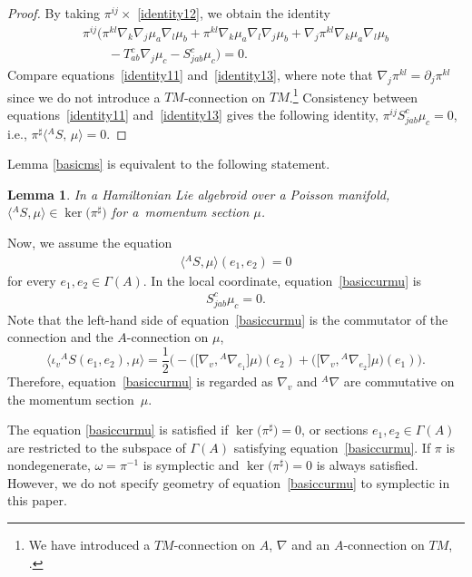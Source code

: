 \documentclass[pdftex]{sigma}
\numberwithin{equation}{section}
\newtheorem{Lemma}[Theorem]{Lemma}
\newcommand{\bracket}[2]{\langle #1,\,#2\rangle}
\newcommand{\nablabas}{{{}^A \nabla}^{\mathrm{bas}}}
\newcommand{\anabla}{{{}^A \nabla}}
\begin{document}
\begin{proof}
By taking $\pi^{ij} \times$ \eqref{identity12},
we obtain the identity
\begin{gather}
 \pi^{ij}\bigl(\pi^{kl} \nabla_k \nabla_j \mu_a \nabla_l \mu_b
+ \pi^{kl} \nabla_k \mu_a \nabla_l \nabla_j \mu_b
+ \nabla_j \pi^{kl} \nabla_k \mu_a \nabla_l \mu_b\nonumber\\
\qquad
{}- T_{ab}^c \nabla_j \mu_c
- S_{jab}^c \mu_c\bigr) =0.
\label{identity13}
\end{gather}
Compare equations~\eqref{identity11} and~\eqref{identity13},
where note that $\nabla_j \pi^{kl} = \partial_j \pi^{kl}$
since we do not introduce a $TM$-connection on $TM$.\footnote{We have introduced a $TM$-connection on $A$, $\nabla$ and
an $A$-connection on $TM$, \smash{$\anabla = \nablabas$}.}
Consistency between equations~\eqref{identity11} and~\eqref{identity13}
gives the following identity,
$\pi^{ij} S_{jab}^c \mu_c =0$,
i.e.,
$ \pi^{\sharp} \bracket{{}^AS}{\mu} =0$.
\end{proof}

Lemma \ref{basicms} is equivalent to the following statement.
\begin{Lemma}\label{basicms2}
In a Hamiltonian Lie algebroid over a Poisson manifold,
$\bigl\langle{}^A S,\mu\bigr\rangle \in \ker\bigl(\pi^{\sharp}\bigr)$
for a~momentum section $\mu$.
\end{Lemma}
Now, we assume the equation
\begin{gather}
\bigl\langle{}^A S,\mu\bigr\rangle(e_1, e_2)
= 0
\label{basiccurmu}
\end{gather}
for every $e_1, e_2 \in \Gamma(A)$.
In the local coordinate, equation~\eqref{basiccurmu} is
\begin{gather}
S_{jab}^c \mu_c =0.
\label{basiccurmu2}
\end{gather}
Note that the left-hand side of equation~\eqref{basiccurmu} is
the commutator of the connection and the $A$-connection on $\mu$,
\[%
\bigl\langle\iota_v {}^A S(e_1, e_2),\mu\bigr\rangle =
\frac{1}{2} \bigl(- \bigl(\bigl[\nabla_{v}, \anabla_{e_1}\bigr] \mu\bigr)(e_2)
+ \bigl(\bigl[\nabla_{v}, \anabla_{e_2}\bigr] \mu\bigr)(e_1)\bigr).
\]
Therefore, equation~\eqref{basiccurmu} is regarded as
$\nabla_{v}$ and $\anabla$ are commutative on the momentum section~$\mu$.

The equation \eqref{basiccurmu} is satisfied if $\ker\bigl(\pi^{\sharp}\bigr)= 0$, or
sections $e_1, e_2 \in \Gamma(A)$ are restricted to the subspace of $\Gamma(A)$
satisfying equation~\eqref{basiccurmu}.
If $\pi$ is nondegenerate, $\omega = \pi^{-1}$ is symplectic and
$\ker\bigl(\pi^{\sharp}\bigr)= 0$ is always satisfied.
However, we do not specify geometry of equation~\eqref{basiccurmu} to
symplectic in this paper.
\end{document}
